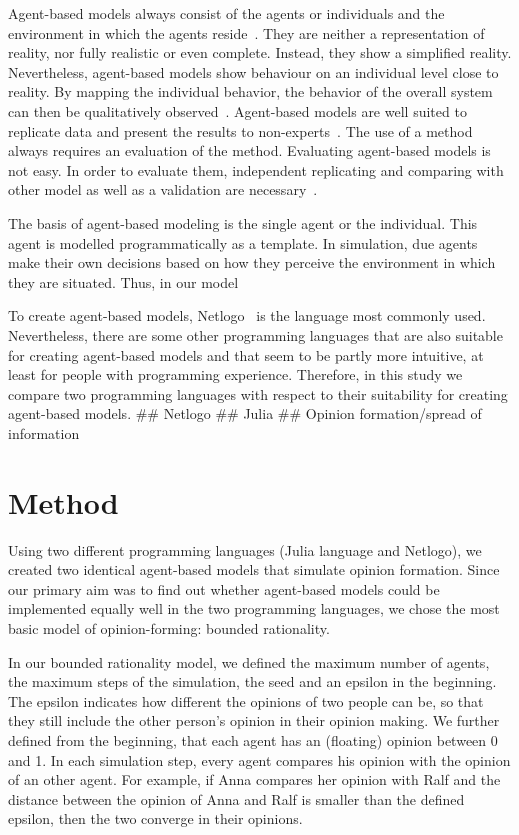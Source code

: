 \documentclass[runningheads]{llncs}
\begin{document}
Agent-based models always consist of the agents or individuals and the
environment in which the agents
reside~\autocite{Bonabeau2002Agentbased}. They are neither a
representation of reality, nor fully realistic or even complete.
Instead, they show a simplified reality. Nevertheless, agent-based
models show behaviour on an individual level close to reality. By
mapping the individual behavior, the behavior of the overall system can
then be qualitatively observed~\autocite{Rouchier2008}. Agent-based
models are well suited to replicate data and present the results to
non-experts~\autocite{Kiesling2012}. The use of a method always requires
an evaluation of the method. Evaluating agent-based models is not easy.
In order to evaluate them, independent replicating and comparing with
other model as well as a validation are
necessary~\autocite{Rouchier2008}.

The basis of agent-based modeling is the single agent or the individual.
This agent is modelled programmatically as a template. In simulation,
due agents make their own decisions based on how they perceive the
environment in which they are situated. Thus, in our model

To create agent-based models, Netlogo~\autocite{Wilensky1999} is the
language most commonly used. Nevertheless, there are some other
programming languages that are also suitable for creating agent-based
models and that seem to be partly more intuitive, at least for people
with programming experience. Therefore, in this study we compare two
programming languages with respect to their suitability for creating
agent-based models. \#\# Netlogo \#\# Julia \#\# Opinion
formation/spread of information

\hypertarget{method}{%
\section{Method}\label{method}}

Using two different programming languages (Julia language and Netlogo),
we created two identical agent-based models that simulate opinion
formation. Since our primary aim was to find out whether agent-based
models could be implemented equally well in the two programming
languages, we chose the most basic model of opinion-forming: bounded
rationality.

In our bounded rationality model, we defined the maximum number of
agents, the maximum steps of the simulation, the seed and an epsilon in
the beginning. The epsilon indicates how different the opinions of two
people can be, so that they still include the other person's opinion in
their opinion making. We further defined from the beginning, that each
agent has an (floating) opinion between 0 and 1. In each simulation
step, every agent compares his opinion with the opinion of an other
agent. For example, if Anna compares her opinion with Ralf and the
distance between the opinion of Anna and Ralf is smaller than the
defined epsilon, then the two converge in their opinions.
\end{document}
